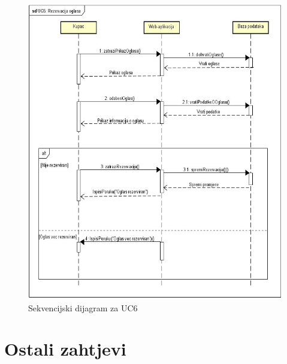 				\begin{figure}[H]
					\includegraphics[scale=1]{dijagrami/SekvencijskiD.PNG} %
					\centering
					\caption{ Sekvencijski dijagram za UC6}
					\label{fig:dijagram3}
				\end{figure}
				\eject
	
		\section{Ostali zahtjevi}
		
		
			 
